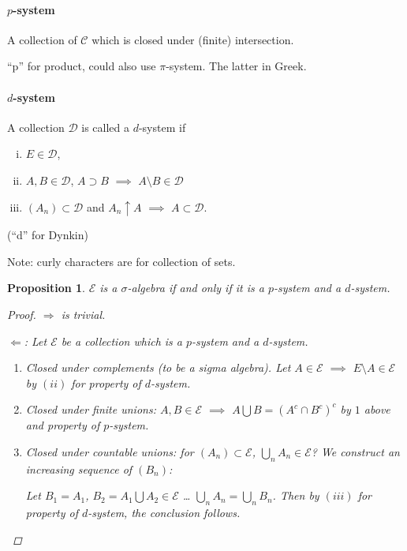 \documentclass[11pt]{article}
\newtheorem{proposition}[theorem]{Proposition}
\begin{document}
\paragraph{$p$-system} A collection of $\mathcal C$ which is closed under
(finite) intersection.

``p'' for product, could also use $\pi$-system. The latter in Greek. 
\paragraph{$d$-system} A collection $\mathcal D$ is called a $d$-system if 
\begin{enumerate}[(i)]
  \item $E\in \mathcal D$, 
  \item $A, B \in \mathcal D$, $A\supset B$ $\implies$ $A\setminus B \in \mathcal D$
  \item $\left( A_n \right) \subset \mathcal D$ and $A_n \uparrow A$ $\implies$
    $A\subset \mathcal D$. 
\end{enumerate}
(``d'' for Dynkin)




Note: curly characters are for collection of sets. 
\begin{proposition}
  $\mathcal E$ is a $\sigma$-algebra if and only if it is a $p$-system and a
  $d$-system. 
  \begin{proof}
    $\Rightarrow$ is trivial.

    $\Leftarrow$: Let $\mathcal E$ be a collection which is a $p$-system and a
    $d$-system. 
    \begin{enumerate}
      \item Closed under complements (to be a sigma algebra).
        Let $A\in  \mathcal E$ $\implies$ $E\setminus A \in \mathcal E$ by
        $(ii)$ for property of $d$-system. 
      \item Closed under finite unions: $A, B \in \mathcal E$ $\implies$
        $A\bigcup B = \left( A^c \cap B^c \right)^c$ by $1$ above and property
        of $p$-system.
      \item Closed under countable unions: for $\left( A_n \right) \subset
        \mathcal E$, $\bigcup _n A_n \in \mathcal E$? We construct an
        increasing sequence of $\left( B_n \right)$: 

        Let $B_1 = A_1$, $B_2 = A_1 \bigcup A_2 \in \mathcal E$ \dots
        $\bigcup _ n A_n = \bigcup _ n B_n $. Then by $(iii)$ for property of
        $d$-system, the conclusion follows.
    \end{enumerate}
  \end{proof}

\end{proposition}
\end{document}
